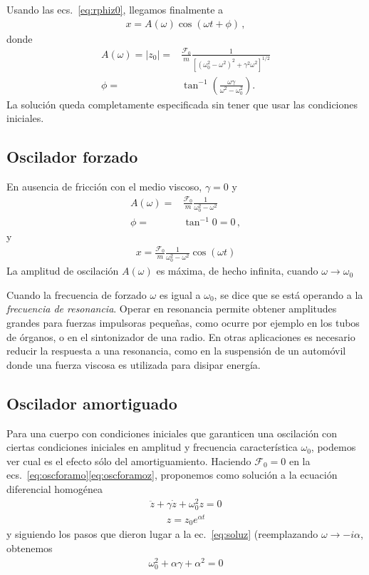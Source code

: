 Usando las ecs.~\eqref{eq:rphiz0}, llegamos finalmente a %
\begin{align}
  \label{eq:soluforzamo}
  x=A(\omega)\cos(\omega t+\phi)\,,
\end{align}
donde
\begin{align}
  \label{eq:aomega}
  A(\omega)=|z_0|=&\frac{\mathcal{F}_0}{m}\frac{1}{\left[\left(\omega_0^2-\omega^2\right)^2+\gamma^2\omega^2\right]^{1/2}}\nonumber\\
  \phi=&\tan^{-1}\left(\frac{\omega\gamma}{\omega^2-\omega_0^2}\right).
\end{align}
La solución queda completamente especificada sin tener que usar las condiciones iniciales. %


\subsection{Oscilador forzado}
En ausencia de fricción con el medio viscoso, $\gamma=0$ y
\begin{align*}
  A(\omega)=&\frac{\mathcal{F}_0}{m}\frac{1}{\omega_0^2-\omega^2}\nonumber\\
  \phi=&\tan^{-1}0=0\,,
\end{align*}
y
\begin{align*}
  x=\frac{\mathcal{F}_0}{m}\frac{1}{\omega_0^2-\omega^2}\cos(\omega t)
\end{align*}
La amplitud de oscilación $A(\omega)$ es máxima, de hecho infinita, cuando $\omega\to \omega_0$ %

Cuando la frecuencia de forzado $\omega$ es igual a $\omega_0$, se dice que se está operando a la \emph{frecuencia de resonancia}. Operar en resonancia permite obtener amplitudes grandes para fuerzas impulsoras pequeñas, como ocurre por ejemplo en los tubos de órganos, o en el sintonizador de una radio. En otras aplicaciones es necesario reducir la respuesta a una resonancia, como en la suspensión de un automóvil donde una fuerza viscosa es utilizada para disipar energía. 

\subsection{Oscilador amortiguado}
Para una cuerpo con condiciones iniciales que garanticen una oscilación con ciertas condiciones iniciales en amplitud y frecuencia característica $\omega_0$, podemos ver cual es el efecto sólo del amortiguamiento. Haciendo $\mathcal{F}_0=0$ en la ecs.~\eqref{eq:oscforamo}\eqref{eq:oscforamoz}, proponemos como solución a la ecuación diferencial homogénea
\begin{align*}
     \ddot z+\gamma \dot z+\omega_0^2 z=0
\end{align*}
\begin{align*}
  z=z_0 e^{\alpha t}
\end{align*}
y siguiendo los pasos que dieron lugar a la ec.~\eqref{eq:soluz} (reemplazando $\omega\to -i\alpha$, obtenemos
\begin{align*}
  \omega_0^2+\alpha \gamma+\alpha^2=0
\end{align*}

